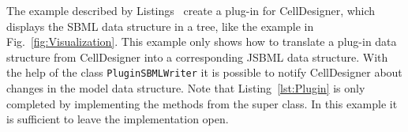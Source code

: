 \documentclass[
  BCOR12mm,
  letterpaper,
  11pt,
  headsepline,
  pointlessnumbers,
  tablecaptionabove,
  headinclude,
  appendixprefix,
  idxtotoc,
  bibtotoc,
  twoside,
  titlepage
]{scrartcl}
\begin{document}
The example described by Listings~
create a plug-in for CellDesigner, which displays the SBML data structure
in a tree, like the example in Fig.~\vref{fig:Visualization}. This example only
shows how to translate a plug-in data structure
from CellDesigner into a corresponding JSBML data structure. With the help of
the class \verb!PluginSBMLWriter! it is possible to notify CellDesigner about
changes in the model data structure. Note that Listing~\vref{lst:Plugin} is only
completed by implementing the methods from the super class. In this example it
is sufficient to leave the implementation open.




\printindex
\end{document}
